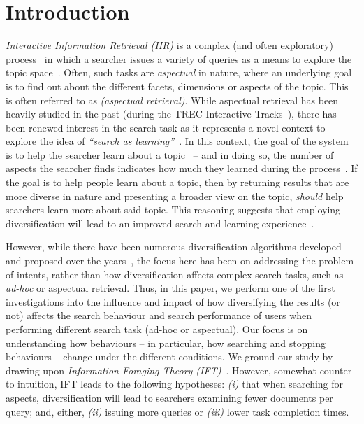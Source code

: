 \section{Introduction} \label{sec:intro}
\emph{Interactive Information Retrieval (IIR)} is a complex (and often exploratory) process~\cite{ingwersen2005theturn} in which a searcher issues a variety of queries as a means to explore the topic space~\cite{kelly2015search_tasks}. Often, such tasks are \emph{aspectual} in nature, where an underlying goal is to find out about the different facets, dimensions or aspects of the topic. This is often referred to as \emph{(aspectual retrieval)}. While aspectual retrieval has been heavily studied in the past (during the TREC Interactive Tracks~\cite{over2001trec}), there has been renewed interest in the search task as it represents a novel context to explore the idea of \emph{``search as learning''}~\cite{collins2017sal}. In this context, the goal of the system is to help the searcher learn about a topic~\cite{collins2017sal} -- and in doing so, the number of aspects the searcher finds indicates how much they learned during the process~\cite{syed2017sal}. If the goal is to help people learn about a topic, then by returning results that are more diverse in nature and presenting a broader view on the topic, \emph{should} help searchers learn more about said topic. This reasoning suggests that employing diversification will lead to an improved search and learning experience~\cite{syed2017sal}. 

However, while there have been numerous diversification algorithms developed and proposed over the years~\cite{carbonell1998mmr,chen2006lessismore,santos2010query_reformulations_diversification,santos2011intent,zhai2015subtopics}, the focus here has been on addressing the problem of intents, rather than how diversification affects complex search tasks, such as \emph{ad-hoc} or aspectual retrieval. Thus, in this paper, we perform one of the first investigations into the influence and impact of how diversifying the results (or not) affects the search behaviour and search performance of users when performing different search task (ad-hoc or aspectual). Our focus is on understanding how behaviours -- in particular, how searching and stopping behaviours -- change under the different conditions. We ground our study by drawing upon \emph{Information Foraging Theory (IFT)}~\cite{pirolli1999ift}. However, somewhat counter to intuition, IFT leads to the following hypotheses: \emph{(i)} that when searching for aspects, diversification will lead to searchers examining fewer documents per query; and, either, \emph{(ii)} issuing more queries or \emph{(iii)} lower task completion times.

